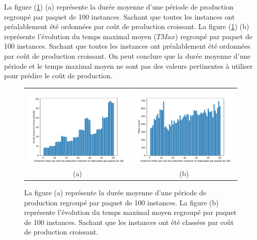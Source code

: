 La figure (\ref{6000_periode_stats}) (a) représente la durée moyenne d'une période de production regroupé par paquet de 100 instances. Sachant que toutes les instances ont préalablement été ordonnées par coût de production croissant.
La figure (\ref{6000_periode_stats}) (b) représente l'évolution du temps maximal moyen ($TMax$) regroupé par paquet de 100 instances. Sachant que toutes les instances ont préalablement été ordonnées par coût de production croissant. On peut conclure que la durée moyenne d'une période et le temps maximal moyen ne sont pas des valeurs pertinentes à utiliser pour prédire le coût de production.
\begin{figure}[H]
	\centering
	\begin{tabular}{c c}
		\includegraphics[width=9cm]{images_these/Stats_instances_P.pdf} &
		\includegraphics[width=9cm]{images_these/Stats_instances_Tmax.pdf}
		\\
		(a) & (b)
	\end{tabular}
	\caption[Évolution du temps maximal moyen regroupé par paquet de 100 instances]{La figure (a) représente la durée moyenne d'une période de production regroupé par paquet de 100 instances. La figure (b) représente l'évolution du temps maximal moyen regroupé par paquet de 100 instances. Sachant que les instances ont été classées par coût de production croissant. }\label{6000_periode_stats}
\end{figure}


